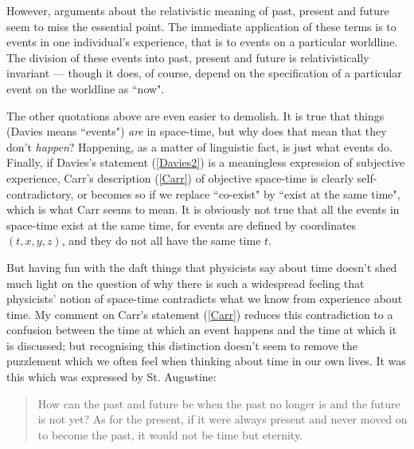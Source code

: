 \documentclass[12pt,a4paper,reqno]{article}
\renewcommand{\(}{\left(}
\renewcommand{\)}{\right)}
\newcommand{\<}{\langle}
\renewcommand{\>}{\rangle}
\theoremstyle{plain} %
\theoremstyle{definition}
\theoremstyle{remark}
\begin{document}
However, arguments about the relativistic meaning of past, present and
future seem to miss the essential point. The immediate application of
these terms is to events in one individual's experience, that is to
events on a particular worldline. The division of these events into
past, present and future is relativistically invariant --- though it
does, of course, depend on the specification of a particular event on
the worldline as ``now".

The other quotations above are even easier to demolish. It is true that things (Davies
means ``events") \emph{are} in space-time, but why does that mean that they
don't \emph{happen}? Happening, as a matter of linguistic fact, is just 
what events do. Finally, if Davies's statement (\ref{Davies2}) is a
meaningless expression of subjective experience, Carr's description
(\ref{Carr}) of objective space-time is clearly self-contradictory, or
becomes so if we replace ``co-exist" by ``exist at the same time", which
is what Carr seems to mean. It is obviously not true that all the events
in space-time exist at the same time, for events are defined by coordinates
$(t,x,y,z)$, and they do not all have the same time $t$.

But having fun with the daft things that physicists say about time
doesn't shed much light on the question of why there is such a
widespread feeling that physicists' notion of space-time contradicts
what we know from experience about time. My comment on Carr's statement
(\ref{Carr}) reduces this contradiction to a confusion between the time
at which an event happens and the time at which it is discussed; but
recognising this distinction doesn't seem to remove the puzzlement which
we often feel when thinking about time in our own lives. It was this
which was expressed by St. Augustine:

\begin{quotation}
\noindent
How can the past and future be when the past no longer is and
the future is not yet? As for the present, if it were always present and
never moved on to become the past, it would not be time but eternity.
\end{quotation}
\end{document}
